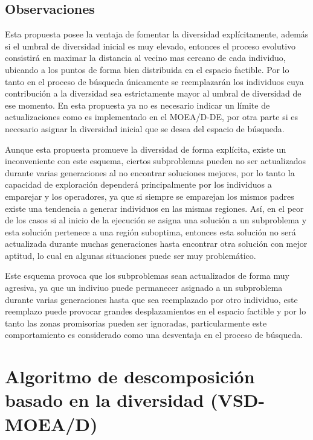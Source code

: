 \subsection{Observaciones}

Esta propuesta posee la ventaja de fomentar la diversidad explícitamente, además si el umbral de diversidad inicial es muy elevado, entonces el proceso evolutivo consistirá en maximar la distancia al vecino mas cercano de cada individuo, ubicando a los puntos de forma bien distribuida en el espacio factible.
%
Por lo tanto en el proceso de búsqueda únicamente se reemplazarán los individuos cuya contribución a la diversidad sea estrictamente mayor al umbral de diversidad de ese momento.
%
En esta propuesta ya no es necesario indicar un límite de actualizaciones como es implementado en el MOEA/D-DE, por otra parte si es necesario asignar la diversidad inicial que se desea del espacio de búsqueda.


Aunque esta propuesta promueve la diversidad de forma explícita, existe un inconveniente con este esquema, ciertos subproblemas pueden no ser actualizados durante varias generaciones al no encontrar soluciones mejores, por lo tanto la capacidad de exploración dependerá principalmente por los individuos a emparejar y los operadores, ya que si siempre se emparejan los mismos padres existe una tendencia a generar individuos en las mismas regiones.
%
Así, en el peor de los casos si al inicio de la ejecución se asigna una solución a un subproblema y esta solución pertenece a una región suboptima, entonces esta solución no será actualizada durante muchas generaciones hasta encontrar otra solución con mejor aptitud, lo cual en algunas situaciones puede ser muy problemático.
%

Este esquema provoca que los subproblemas sean actualizados de forma muy agresiva, ya que un indiviuo puede permanecer asignado a un subproblema durante varias generaciones hasta que sea reemplazado por otro individuo, este reemplazo puede provocar grandes desplazamientos en el espacio factible y por lo tanto las zonas promisorias pueden ser ignoradas, particularmente este comportamiento es considerado como una desventaja en el proceso de búsqueda.
%

\section{Algoritmo de descomposición basado en la diversidad (VSD-MOEA/D)}

